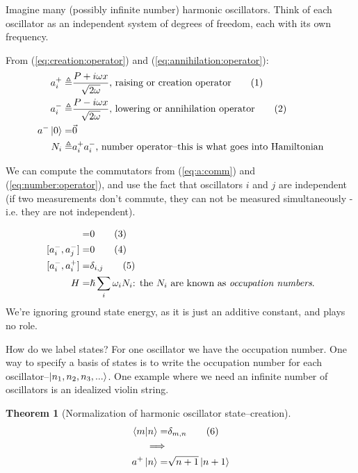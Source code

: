 \documentclass[]{article}
\newcommand\numberthis{\addtocounter{equation}{1}\tag{\theequation}}
\newtheorem{thm}{Theorem}
\begin{document}
Imagine many (possibly infinite number) harmonic oscillators. Think of each oscillator  as an independent system of degrees of freedom, each with its own frequency.

From (\ref{eq:creation:operator}) and (\ref{eq:annihilation:operator}):
\begin{align*}
	a^+_i \triangleq & \frac{P + i \omega x } {\sqrt{2 \omega}} \text{, raising or creation operator} \numberthis \label{eq:creation:operator:i}\\
	a^-_i \triangleq & \frac{P - i \omega x } {\sqrt{2 \omega}}\text{, lowering or annihilation operator} \numberthis \label{eq:annihilation:operator_i}\\
	a^-\ket{0} =& \vec{0}\\
	N_i\triangleq& a^+_i a^-_i \text{, number operator--this is what goes into Hamiltonian} 
\end{align*}

 We can compute the commutators from  (\ref{eq:a:comm}) and (\ref{eq:number:operator}), and use the fact that oscillators $i$ and $j$ are independent (if two measurements don't commute, they can not be measured simultaneously - i.e. they are not independent). 

\begin{align*}
	[a^+_i,a^+_j] =& 0 \numberthis \label{eq:a:comm_i_plus}\\
	[a^-_i,a^-_j] =& 0 \numberthis \label{eq:a:comm_i_minus}\\
	[a^-_i,a^+_i] =& \delta_{i,j} \numberthis \label{eq:a:comm_i}\\
	H =& \hslash \sum_{i}  \omega_i N_i\text{: the $N_i$ are known as \emph{occupation numbers}.}
\end{align*}
We're ignoring ground state energy, as it is just an additive constant, and plays no role.

How do we label states? For one oscillator we have the occupation number. One way to specify a basis of states is to write the occupation number for each oscillator--$\ket{n_1,n_2,n_3,...}$. One example where we need an infinite number of oscillators is an idealized violin string.

\begin{thm}[Normalization of harmonic oscillator state--creation]\label{thm:norm:harmonic}
	\begin{align*}
		\braket{m|n}=&\delta_{m,n} \numberthis \label{eq:norm}\\
		\implies&\\
		a^+\ket{n}=&\sqrt{n+1}\ket{n+1}
	\end{align*}
\end{thm} 
\end{document}
